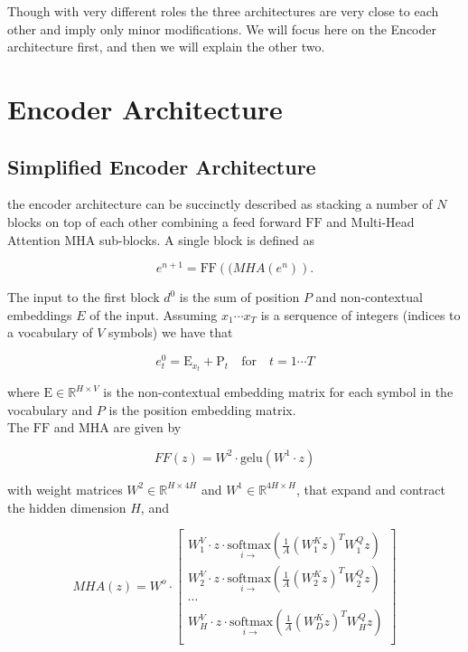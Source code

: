 Though with very different roles the three architectures are very close to each other and imply only minor modifications. We will focus here on the Encoder architecture first, and then we will explain the other two.

\section{Encoder Architecture}

\subsection{Simplified Encoder Architecture}

the encoder architecture can be succinctly described as stacking a number of $N$ blocks on top of each other combining a feed forward $\mathrm{FF}$ and Multi-Head Attention $\mathrm{MHA}$ sub-blocks. A single block is defined as

\begin{equation}
e^{n+1} = \mathrm{FF}(\mathrm(MHA(e^n)).
\end{equation}

The input to the first block $d^0$ is the sum of position $P$ and non-contextual embeddings $E$ of the input. Assuming $x_1 \cdots x_T$ is a serquence of integers (indices to a vocabulary of $V$ symbols) we have that

\begin{equation}
e^{0}_t = \mathrm{E}_{x_t} + \mathrm{P}_t \quad \mbox{for} \quad t=1 \cdots T
\end{equation}

where $\mathrm{E} \in \mathbb{R}^{H \times V}$ is the non-contextual embedding matrix for each symbol in the vocabulary and $P$ is the position embedding matrix.\\

\noindent The $\mathrm{FF}$ and $\mathrm{MHA}$ are given by

\begin{equation}
FF(z) = W^2\cdot \mathrm{gelu}(W^1 \cdot z)
\end{equation}

\noindent with weight matrices $W^2 \in \mathbb{R}^{H \times 4H}$ and $W^1 \in \mathbb{R}^{4H \times H}$, that expand and contract the hidden dimension $H$, and

\begin{equation}
MHA(z) =  W^o \cdot
\begin{bmatrix}
    W^V_1 \cdot z \cdot \underset{i \rightarrow}{\mathrm{softmax}}\left( \frac{1}{A} \left(W^K_1 z\right)^T W^Q_1 z \right)\\
    W^V_2 \cdot z \cdot \underset{i \rightarrow}{\mathrm{softmax}}\left( \frac{1}{A} \left(W^K_2 z\right)^T W^Q_2 z \right)\\
    \cdots\\
    W^V_H \cdot z \cdot \underset{i \rightarrow}{\mathrm{softmax}}\left( \frac{1}{A} \left(W^K_D z\right)^T W^Q_H z \right)\\
\end{bmatrix}\nonumber
\end{equation}

